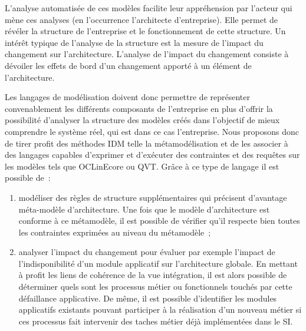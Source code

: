 L'analyse automatisée de ces modèles facilite leur appréhension par l'acteur qui mène ces analyses (en l'occurrence l'architecte d'entreprise). Elle permet de révéler la structure de l'entreprise et le fonctionnement de cette structure. Un intérêt  typique de l'analyse de la structure est la mesure de l'impact du changement \cite{de2005change} sur l'architecture. L'analyse de l'impact du changement consiste à dévoiler les effets de bord d'un changement apporté à un élément de l'architecture.  

Les langages de modélisation doivent donc permettre de représenter convenablement les différents composants de l'entreprise en plus d'offrir la possibilité d'analyser la structure des modèles créés dans l'objectif de mieux comprendre le système réel, qui est dans ce cas l'entreprise. Nous proposons donc de tirer profit des méthodes IDM telle la métamodélisation et de les associer à des langages capables d'exprimer et d'exécuter des contraintes et des requêtes sur les modèles tels que OCLinEcore ou QVT. Grâce à ce type de langage il est possible de~:
\begin{enumerate}
\item modéliser des règles de structure supplémentaires qui précisent d'avantage méta-modèle d'architecture. Une fois que le modèle d'architecture est conforme à ce métamodèle, il est possible de vérifier qu'il respecte bien toutes les contraintes exprimées au niveau du métamodèle~;
\item analyser l'impact du changement pour évaluer par exemple l'impact de l'indisponibilité d'un module applicatif sur l'architecture globale. En mettant à profit les liens de cohérence de la vue intégration, il est alors possible de déterminer quels sont les processus métier ou fonctionnels touchés par cette défaillance applicative. De même, il est possible d'identifier les modules applicatifs existants pouvant participer à la réalisation d'un nouveau métier si ces processus fait intervenir des taches métier déjà implémentées dans le SI.
\end{enumerate}




 


